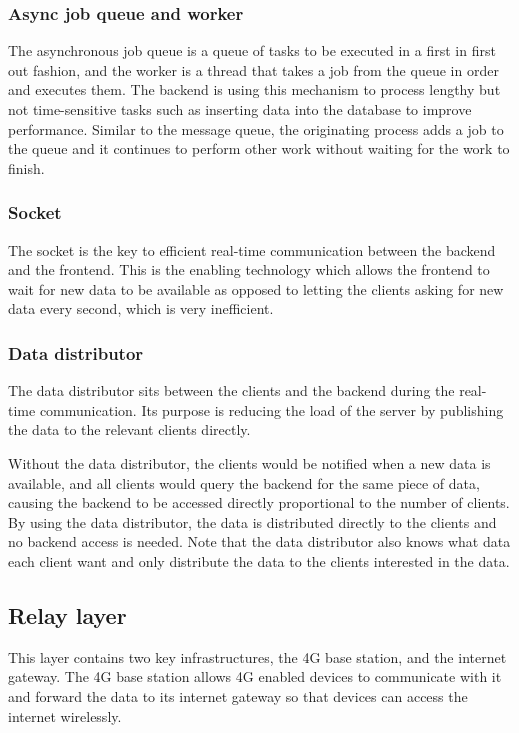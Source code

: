 \documentclass[../thesis.tex]{subfiles}
\begin{document}
\subsubsection{Async job queue and worker}

The asynchronous job queue is a queue of tasks to be executed in a first in first out fashion, and the worker is a thread that takes a job from the queue in order and executes them. The backend is using this mechanism to process lengthy but not time-sensitive tasks such as inserting data into the database to improve performance. Similar to the message queue, the originating process adds a job to the queue and it continues to perform other work without waiting for the work to finish.

\subsubsection{Socket}

The socket is the key to efficient real-time communication between the backend and the frontend. This is the enabling technology which allows the frontend to wait for new data to be available as opposed to letting the clients asking for new data every second, which is very inefficient.

\subsubsection{Data distributor}

The data distributor sits between the clients and the backend during the real-time communication. Its purpose is reducing the load of the server by publishing the data to the relevant clients directly.

Without the data distributor, the clients would be notified when a new data is available, and all clients would query the backend for the same piece of data, causing the backend to be accessed directly proportional to the number of clients. By using the data distributor, the data is distributed directly to the clients and no backend access is needed. Note that the data distributor also knows what data each client want and only distribute the data to the clients interested in the data.

\subsection{Relay layer}

This layer contains two key infrastructures, the 4G base station, and the internet gateway. The 4G base station allows 4G enabled devices to communicate with it and forward the data to its internet gateway so that devices can access the internet wirelessly.
\end{document}
